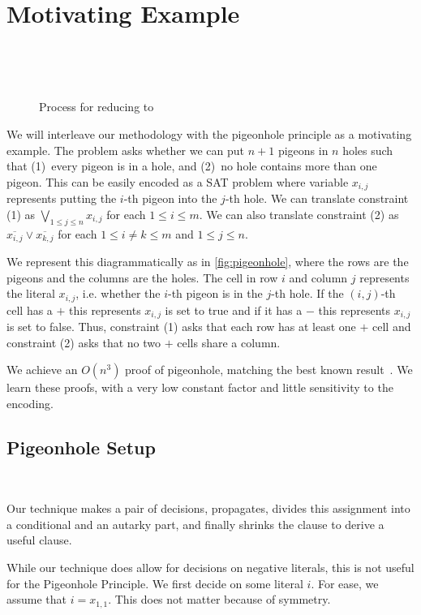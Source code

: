 \section{Motivating Example}~\label{sec:motivatex}

\begin{figure}[!t]
    \centering
    
    \caption{Process for reducing  to }~\label{fig:pigeonhole}
  \end{figure}

We will interleave our methodology with the pigeonhole principle as a motivating
example. The problem  asks whether we can put $n+1$ pigeons in $n$ holes
such that (1)~every pigeon is in a hole, and (2)~no hole contains more than one
pigeon. This can be easily encoded as a SAT problem where variable $x_{i, j}$
represents putting the $i$-th pigeon into the $j$-th hole. We can translate
constraint (1) as $\bigvee_{1 \leq j \leq n} x_{i, j}$ for each $1 \leq i \leq
m$. We can also translate constraint (2) as $\overline{x_{i, j}} \lor
\overline{x_{k, j}}$ for each $ 1 \leq i \neq k \leq m$ and $1 \leq j \leq n$.

We represent this diagrammatically as in \autoref{fig:pigeonhole}, where the
rows are the pigeons and the columns are the holes. The cell in row $i$ and
column $j$ represents the literal $x_{i, j}$, i.e. whether the $i$-th pigeon is
in the $j$-th hole. If the $(i, j)$-th cell has a $+$ this represents $x_{i, j}$
is set to true and if it has a $-$ this represents $x_{i, j}$ is set to false.
Thus, constraint (1) asks that each row has at least one $+$ cell and
constraint (2) asks that no two $+$ cells share a column.

We achieve an $O(n^3)$ \pr proof of pigeonhole, matching the best known
result~\cite{prclauses}. We learn these proofs, with a very low constant
factor and little sensitivity to the encoding.


\subsection{Pigeonhole Setup}~\label{subsec:pigeonhole-setup}

Our technique makes a pair of decisions, propagates, divides this
assignment into a conditional and an autarky part, and finally shrinks the
clause to derive a useful \pr clause.

While our technique does allow for decisions on negative literals, this is not
useful for the Pigeonhole Principle. We first decide on some literal $i$. For
ease, we assume that $i = x_{1, 1}$. This does not matter because of symmetry.

